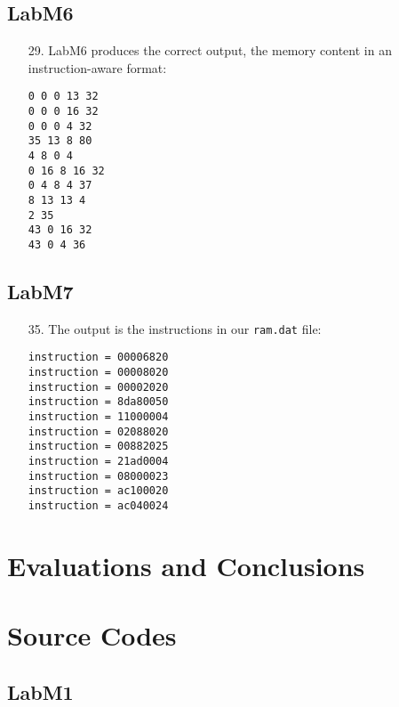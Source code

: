 \documentclass{article}
\begin{document}
\subsection{LabM6}
\begin{enumerate}
\item[29. ] LabM6 produces the correct output, the memory content in an
instruction-aware format:
\begin{verbatim}
0 0 0 13 32
0 0 0 16 32
0 0 0 4 32
35 13 8 80
4 8 0 4
0 16 8 16 32
0 4 8 4 37
8 13 13 4
2 35
43 0 16 32
43 0 4 36
\end{verbatim}
\end{enumerate}

\subsection{LabM7}
\begin{enumerate}
\item[35. ] The output is the instructions in our \verb$ram.dat$ file:
\begin{verbatim}
instruction = 00006820
instruction = 00008020
instruction = 00002020
instruction = 8da80050
instruction = 11000004
instruction = 02088020
instruction = 00882025
instruction = 21ad0004
instruction = 08000023
instruction = ac100020
instruction = ac040024
\end{verbatim}
\end{enumerate}


\section{Evaluations and Conclusions}



\section{Source Codes}

\subsection{LabM1}

\end{document}
